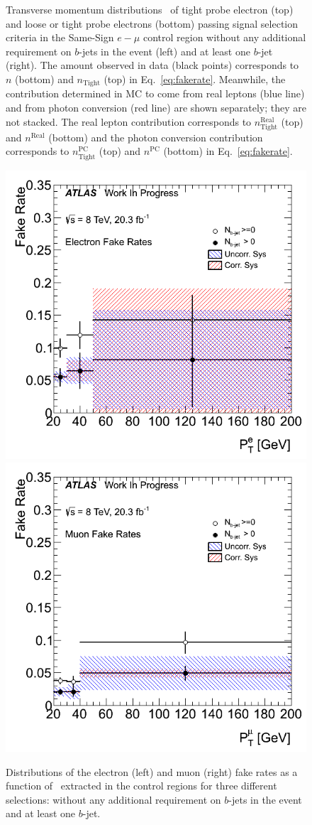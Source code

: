 \begin{figure}[h!]
{}
\vspace{-10mm}\caption{Transverse momentum distributions \pt\ of tight probe electron (top) and loose or tight probe electrons (bottom) passing signal selection criteria in the Same-Sign $e-\mu$ control region without any additional requirement on $b$-jets in the event (left) and at least one $b$-jet (right).
The amount observed in data (black points) corresponds to $n$ (bottom) and $n_{\textrm{Tight}}$ (top) in Eq.~\ref{eq:fakerate}. 
Meanwhile, the contribution determined in MC to come from real leptons (blue line) and from photon conversion (red line) are shown 
separately; they are not stacked. The real lepton contribution corresponds to 
$n_{\textrm{Tight}}^{\textrm{Real}}$ (top) and $n^{\textrm{Real}}$ (bottom) and the photon conversion 
contribution corresponds to $n_{\textrm{Tight}}^{\textrm{PC}}$ (top) and $n^{\textrm{PC}}$ (bottom) in Eq.~\ref{eq:fakerate}.  }
\label{fig:fakeEff_CRs_electron}
\end{figure}






\begin{figure}[ht!]
\centering
\includegraphics[width=0.45\columnwidth]{figures/fakes_bkg/Efficiencies/ElectronFakeRates.png}
\includegraphics[width=0.45\columnwidth]{figures/fakes_bkg/Efficiencies/MuonFakeRates.png}
\caption{Distributions of the electron (left) and muon (right) fake rates as a function of \pt\ extracted in the control regions for three different selections: without any additional requirement on $b$-jets in the event and at least one $b$-jet.}
\label{fig:fakeEff}
\end{figure}




